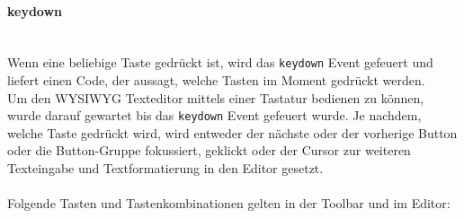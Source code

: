 \paragraph{keydown}\mbox{}\\
Wenn eine beliebige Taste gedrückt ist, wird das \texttt{keydown} Event gefeuert und liefert einen Code, der aussagt, welche Tasten im Moment gedrückt werden.\\
Um den WYSIWYG Texteditor mittels einer Tastatur bedienen zu können, wurde darauf gewartet bis das \texttt{keydown} Event gefeuert wurde. Je nachdem, welche Taste gedrückt wird, wird entweder der nächste oder der vorherige Button oder die Button-Gruppe fokussiert, geklickt oder der Cursor zur weiteren Texteingabe und Textformatierung in den Editor gesetzt.\\
\\Folgende Tasten und Tastenkombinationen gelten in der Toolbar und im Editor:

